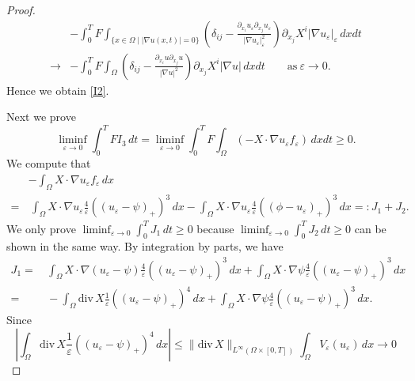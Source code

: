 \documentclass{amsart}
\theoremstyle{definition}
\newcommand{\divergence}{\mathrm{div}\,}
\begin{document}
\begin{proof}
\begin{equation}
\begin{split}
&- 
\int_0 ^T F \int_{\{ x \in \Omega \mid |\nabla u (x,t)| = 0 \}} \left( \delta_{ij} -  \frac{\partial_{x_i} u_\varepsilon \partial_{x_j} u_\varepsilon }{|\nabla u_\varepsilon|_\varepsilon ^2} \right) \partial _{x_j} X^i |\nabla u_\varepsilon|_\varepsilon \, dx dt \\
\to &  
-\int_0 ^T F
\int_{\Omega} \left( \delta_{ij} - \frac{ \partial_{x_i} u \partial _{x_j} u }{|\nabla u|^2} \right)
\partial_{x_j} X^i |\nabla u| \, dx dt \qquad \text{as} \ \varepsilon \to 0.
\end{split}
\end{equation}
Hence we obtain \eqref{I2}.

Next we prove 
\begin{equation}\label{I3}
\liminf_{\varepsilon \to 0} \int _0 ^T F I_3 \, dt =
\liminf_{\varepsilon \to 0} \int _0 ^T F\int_{\Omega} (-X \cdot \nabla u_\varepsilon f_\varepsilon  ) \, dx dt \geq 0.
\end{equation}
We compute that
\begin{equation}
\begin{split}
&-\int_{\Omega} X \cdot \nabla u_\varepsilon f_\varepsilon   \, dx\\
=& \, \int_\Omega X \cdot \nabla u_\varepsilon \frac{4}{\varepsilon} ((u_\varepsilon -\psi)_+)^3 \, dx - 
\int_\Omega X \cdot \nabla u_\varepsilon \frac{4}{\varepsilon} ((\phi -u_\varepsilon)_+)^3 \, dx 
= :  J_1 + J_2.
\end{split}
\end{equation}
We only prove $\liminf_{\varepsilon \to 0} \int_0 ^T J_1 \, dt \geq 0$
because
$\liminf_{\varepsilon \to 0} \int_0 ^T J_2 \, dt \geq 0$ can be shown in the same way. By integration by parts, we have
\begin{equation*}
\begin{split}
J_1 = & \, \int_\Omega X \cdot \nabla (u_\varepsilon-\psi) \frac{4}{\varepsilon} ((u_\varepsilon -\psi)_+)^3 \, dx
+\int_\Omega X \cdot \nabla \psi \frac{4}{\varepsilon} ((u_\varepsilon -\psi)_+)^3 \, dx \\
= & \, 
-\int_\Omega \divergence X \frac{1}{\varepsilon} ((u_\varepsilon -\psi)_+)^4 \, dx
+\int_\Omega X \cdot \nabla \psi \frac{4}{\varepsilon} ((u_\varepsilon -\psi)_+)^3 \, dx.
\end{split}
\end{equation*}
Since
\[
\left|\int_\Omega \divergence X \frac{1}{\varepsilon} ((u_\varepsilon -\psi)_+)^4 \, dx\right|
\leq \| \divergence X \|_{L^\infty (\Omega \times [0,T])} \int_{\Omega} V_\varepsilon (u_\varepsilon) \, dx \to 0
\]
\end{proof}
\end{document}
